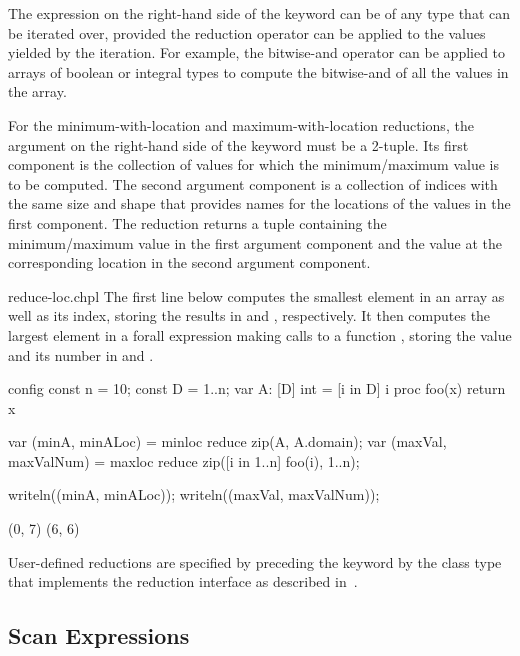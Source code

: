 The expression on the right-hand side of the  keyword
can be of any type that can be iterated over, provided
the reduction operator can be applied to the values yielded
by the iteration. For example, the bitwise-and
operator can be applied to arrays of boolean or integral types to
compute the bitwise-and of all the values in the array.

For the minimum-with-location and maximum-with-location reductions,
the argument on the right-hand side of the  keyword
must be a 2-tuple. Its first component is the collection
of values for which the minimum/maximum value is to be computed.  The
second argument component is a collection of indices with the same size and
shape that provides names for the locations of the values in the first
component.  The reduction returns a tuple containing the
minimum/maximum value in the first argument component and the value
at the corresponding location in the second argument component.

\begin{chapelexample}{reduce-loc.chpl}
The first line below computes the smallest element in an array
 as well as its index, storing the results in  and
, respectively.  It then computes the largest element in
a forall expression making calls to a function , storing
the value and its number in  and .
\begin{chapelnoprint}
config const n = 10;
const D = {1..n};
var A: [D] int = [i in D] i %
proc foo(x) return x %
\end{chapelnoprint}
\begin{chapel}
var (minA, minALoc) = minloc reduce zip(A, A.domain); 
var (maxVal, maxValNum) = maxloc reduce zip([i in 1..n] foo(i), 1..n);
\end{chapel}
\begin{chapelnoprint}
writeln((minA, minALoc));
writeln((maxVal, maxValNum));
\end{chapelnoprint}
\begin{chapeloutput}
(0, 7)
(6, 6)
\end{chapeloutput}
\end{chapelexample}

User-defined reductions are specified by preceding the
keyword  by the class type that implements the reduction
interface as described in~.

\subsection{Scan Expressions}
\label{scan}

